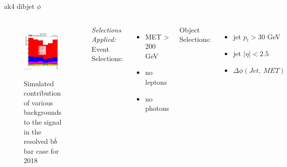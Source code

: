 \documentclass[10pt,xcolor=dvipsnames]{beamer}
\begin{document}
\begin{frame}[fragile]{ak4 dibjet $\phi $ }
  \begin{columns}
    \begin{figure}
      \centering
      \includegraphics[width=1\textwidth]{../Backgrounds/plots/SR_Resolved_Backgrounds_dijets_phi_Combined.png}
      \label{contribution}
      \caption{Simulated contribution of various backgrounds to the signal in the resolved b$ \bar{b} $ bar case for 2018}
    \end{figure}
    \textit{Selections Applied:} \\
    Event Selections:
    \begin{itemize}
      \raggedright 
      \tiny
      \item {MET > 200 GeV}
      \item {no leptons}
      \item {no photons}
    \end{itemize}
    Object Selections:
    \begin{itemize}
      \raggedright 
      \tiny
      \item {jet $p_t > 30 $ GeV}
      \item {jet $| \eta | < 2.5 $}
      \item {$\Delta \phi (Jet, \ MET)$}

\end{itemize}
\end{columns}
\end{frame}
\end{document}
